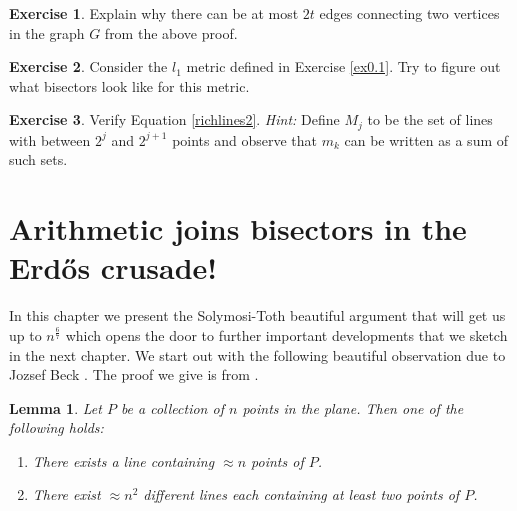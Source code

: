 \documentclass[]{amsart}
\numberwithin{equation}{section}
\theoremstyle{plain}
\newtheorem{lemma}[theorem]{Lemma}
\theoremstyle{definition}
\newtheorem{exercise}{Exercise}[section]
\theoremstyle{remark}
\begin{document}
\begin{exercise} \label{ex4.1}
Explain why there can be at most $2t$ edges connecting
two vertices in the graph $G$ from the above proof.
\end{exercise}

\begin{exercise} \label{ex4.2}
Consider the $l_1$ metric defined in Exercise \ref{ex0.1}.  Try to
figure out what bisectors look like for this metric.
\end{exercise}

\begin{exercise} \label{ex4.3}
Verify Equation \ref{richlines2}.  {\it Hint:}  Define $M_j$ to be the set of lines with between $2^j$ and $2^{j+1}$ points and observe that $m_k$ can be written as a sum of such sets.
\end{exercise}

\section{Arithmetic joins bisectors in the Erd\H{o}s crusade!}


In this chapter we present the Solymosi-Toth beautiful argument
that will get us up to $n^{\frac{6}{7}}$ which opens the door to
further important developments that we sketch in the next chapter.
We start out with the following beautiful observation due to
Jozsef Beck \cite{Beck}.  The proof we give is from \cite{Sol2}.

\begin{lemma} \label{Beck}
Let $P$ be a collection of $n$ points in the plane. Then
one of the following holds:
\begin{enumerate}
\item There exists a line containing  $\approx n$ points of $P$.
\item There exist $ \approx n^2$ different lines each
containing at least two points of $P$.
\end{enumerate}
\end{lemma}
\end{document}
